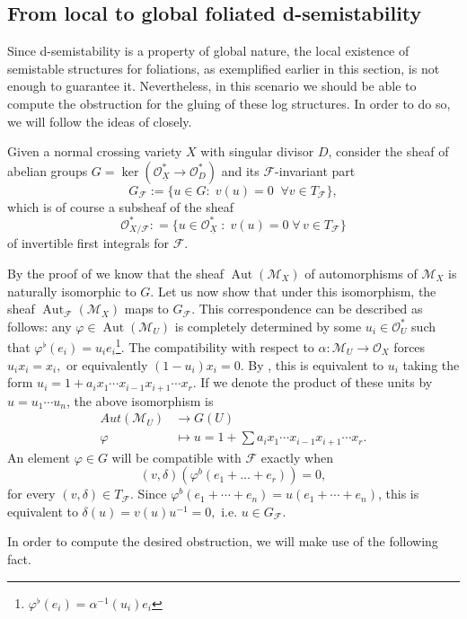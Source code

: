 \documentclass[reqno]{amsart}
\newcommand{\OO}{\mathcal{O}}
\newcommand{\F}{\mathscr{F}}
\newcommand{\M}{\mathcal{M}}
\DeclareMathOperator{\Aut}{Aut}
\newcounter{Theorem}
\theoremstyle{definition}
\theoremstyle{named}
\begin{document}
\subsection{From local to global foliated d-semistability} Since d-semistability is a property of global nature, the local existence of semistable structures for foliations, as exemplified earlier in this section, is not enough to guarantee it. Nevertheless, in this scenario we should be able to compute the obstruction for the gluing of these log structures. In order to do so, we will follow the ideas of \cite{olsson2003universal} closely. 


Given a normal crossing variety $X$ with singular divisor $D$, consider the sheaf of abelian groups $G=\ker(\OO^\ast_{\underline{X}}\to \OO^*_D)$ and its $\F$-invariant part 
$$G_\F :=\big\{u\in G:\;v(u) = 0\;\;\forall v\in T_\F\big\},$$
which is of course a subsheaf of the sheaf 
 $$\OO_{X/\F}^\ast : = \{u\in \OO_{\underline{X}}^\ast\; : \; v(u) = 0\;\forall\, v\in T_\F\}$$
 of invertible first integrals for $\F$.
 
By the proof of \cite[Theorem 3.14]{olsson2003universal} we know that the sheaf $\Aut(\M_X)$ of automorphisms of $\M_X$ is naturally isomorphic to $G$. Let us now show that under this isomorphism, the sheaf $\Aut_\F(\M_X)$ maps to $G_\F$. This correspondence can be described as follows:
any $\varphi\in\Aut(\M_U)$ is completely determined by some $u_i\in \OO_U^*$ such that $\varphi^\flat(e_i)=u_i e_i$\footnote{$\varphi^\flat(e_i)=\alpha^{-1}(u_i) e_i$}. The compatibility with respect to $\alpha:\M_U\to \OO_X$ forces $u_ix_i=x_i,$ or equivalently $(1-u_i)x_i=0$. By \cite[Lemma 3.15]{olsson2003universal}, this is equivalent to $u_i$ taking the form $u_i=1+a_ix_1\cdots x_{i-1}x_{i+1}\cdots x_r$. If we denote the product of these units by $u=u_1\cdots u_n$, the above isomorphism is
\begin{align*}
     Aut(\M_U)&\to G(U)\\
     \varphi &\mapsto u= 1+\sum a_ix_1\cdots x_{i-1}x_{i+1}\cdots x_r.
 \end{align*}
An element $\varphi\in G$ will be compatible with $\F$ exactly when 
$$ (v,\delta)(\varphi^b(e_1+\dots+e_r))=0,$$
for every $(v,\delta)\in T_\F$. Since $\varphi^b(e_1+\cdots+e_n)=u(e_1+\cdots+e_n)$, this is equivalent to $\delta(u)= v(u)u^{-1}=0,$ i.e. $u\in G_\F$.

In order to compute the desired obstruction, we will make use of the following fact.
\end{document}
